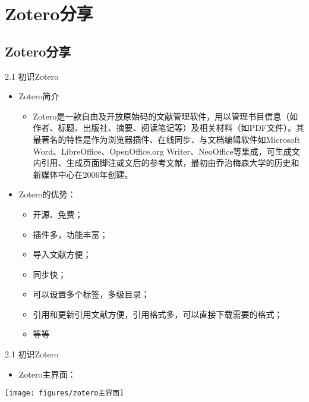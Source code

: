 \documentclass{beamer}%
\begin{document}
\section{Zotero分享}  %
\subsection*{Zotero分享}


\begin{frame}[t]{2.1 初识Zotero}
\begin{itemize}
  \item Zotero简介
  \begin{itemize}
    \item Zotero是一款自由及开放原始码的文献管理软件，用以管理书目信息（如作者、标题、出版社、摘要、阅读笔记等）及相关材料（如PDF文件）。其最著名的特性是作为浏览器插件、在线同步、与文档编辑软件如Microsoft Word、LibreOffice、OpenOffice.org Writer、NeoOffice等集成，可生成文内引用、生成页面脚注或文后的参考文献，最初由乔治梅森大学的历史和新媒体中心在2006年创建。
  \end{itemize}
  \item Zotero的优势：
  \begin{itemize}
    \item 开源、免费；
    \item 插件多，功能丰富；
    \item 导入文献方便；
    \item 同步快；
    \item 可以设置多个标签，多级目录；
    \item 引用和更新引用文献方便，引用格式多，可以直接下载需要的格式；
    \item 等等
  \end{itemize}
\end{itemize}
\end{frame}






\begin{frame}[t]{2.1 初识Zotero}
\begin{itemize}
  \item Zotero主界面：
\end{itemize}
\vspace{-0.4cm} %
\begin{center}
		\texttt{[image: figures/zotero主界面]}
\end{center}
\end{frame}
\end{document}
